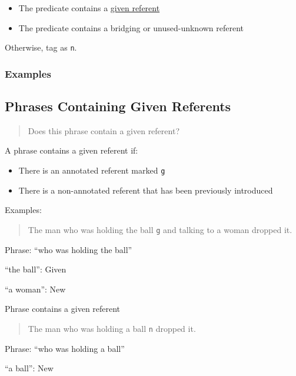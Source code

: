 \documentclass[
]{book}
\providecommand{\tightlist}{%
  \setlength{\itemsep}{0pt}\setlength{\parskip}{0pt}}
\begin{document}
\begin{itemize}
\tightlist
\item
  The predicate contains a \protect\hyperlink{phrases-containing-given-referents}{given referent}
\item
  The predicate contains a bridging or unused-unknown referent
\end{itemize}

Otherwise, tag as \texttt{n}.

\hypertarget{examples}{%
\subsubsection{Examples}\label{examples}}

\hypertarget{phrases-containing-given-referents}{%
\subsection{Phrases Containing Given Referents}\label{phrases-containing-given-referents}}

\begin{quote}
Does this phrase contain a given referent?
\end{quote}

A phrase contains a given referent if:

\begin{itemize}
\item
  There is an annotated referent marked \texttt{g}
\item
  There is a non-annotated referent that has been previously introduced
\end{itemize}

Examples:

\begin{quote}
The man who was holding the ball \texttt{g} and talking to a woman dropped it.
\end{quote}

Phrase: ``who was holding the ball''

``the ball'': Given

``a woman'': New

Phrase contains a given referent

\begin{quote}
The man who was holding a ball \texttt{n} dropped it.
\end{quote}

Phrase: ``who was holding a ball''

``a ball'': New
\end{document}
